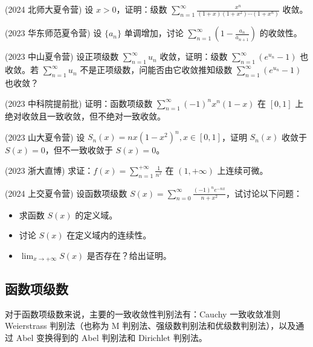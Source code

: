 \documentclass[lang=cn,10pt,thmcnt=section]{elegantbook}
\begin{document}
	\begin{example}
	(2024 北师大夏令营) 设 $x > 0$，证明：级数 $\sum_{n=1}^{\infty} \frac{x^n}{(1+x)(1+x^2)\cdots(1+x^n)}$ 收敛。
	\end{example}
	
	\begin{example}
	(2023 华东师范夏令营) 设 $\{a_n\}$ 单调增加，讨论 $\sum_{n=1}^{\infty} \left(1 - \frac{a_n}{a_{n+1}}\right)$ 的收敛性。
	\end{example}
	
	\begin{example}
	(2023 中山夏令营) 设正项级数 $\sum_{n=1}^{\infty} u_n$ 收敛，证明：级数 $\sum_{n=1}^{\infty} (e^{u_n} - 1)$ 也收敛。若 $\sum_{n=1}^{\infty} u_n$ 不是正项级数，问能否由它收敛推知级数 $\sum_{n=1}^{\infty} (e^{u_n} - 1)$ 也收敛？
	\end{example}
	
	\begin{example}
	(2023 中科院提前批) 证明：函数项级数 $\sum_{n=1}^{\infty} (-1)^n x^n (1-x)$ 在 $[0,1]$ 上绝对收敛且一致收敛，但不绝对一致收敛。
	\end{example}
	
	\begin{example}
	(2023 山大夏令营) 设 $S_n(x) = nx(1-x^2)^n, x \in [0,1]$，证明 $S_n(x)$ 收敛于 $S(x) = 0$，但不一致收敛于 $S(x) = 0$。
	\end{example}
	
	\begin{example}
	(2023 浙大直博) 求证：$f(x) = \sum_{n=1}^{+\infty} \frac{1}{n^x}$ 在 $(1, +\infty)$ 上连续可微。
	\end{example}
	
	\begin{example}
	(2024 上交夏令营) 设函数项级数 $S(x) = \sum_{n=0}^{\infty} \frac{(-1)^n e^{-nx}}{n+x^2}$，试讨论以下问题：
	\begin{itemize}
		\item 求函数 $S(x)$ 的定义域。
		\item 讨论 $S(x)$ 在定义域内的连续性。
		\item $\lim_{x \to +\infty} S(x)$ 是否存在？给出证明。
	\end{itemize}
	\end{example}
	
\subsection{函数项级数}
对于函数项级数来说，主要的一致收敛性判别法有：Cauchy 一致收敛准则 Weierstrass 判别法（也称为 M 判别法、强级数判别法和优级数判别法），以及通过 Abel 变换得到的 Abel 判别法和 Dirichlet 判别法。
\end{document}
